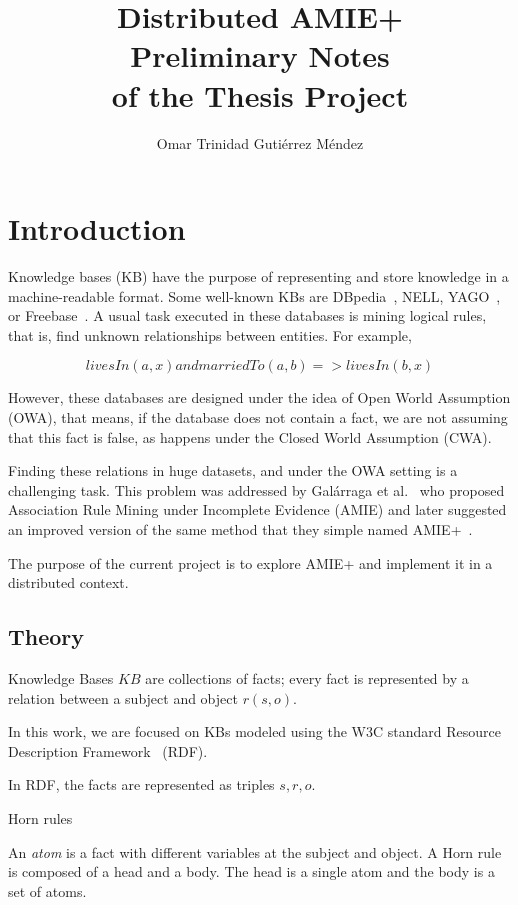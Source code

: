 \documentclass{article}
\title{
Distributed AMIE+\\
\large Preliminary Notes\\
of the Thesis Project\\
}
\author{Omar Trinidad Guti\'errez M\'endez}
\begin{document}
\maketitle

\section{Introduction}

Knowledge bases (KB) have the purpose of representing and store knowledge in a
machine-readable format. Some well-known KBs are DBpedia~\cite{dbpedia-swj},
NELL, YAGO~\cite{suchanek2007yago}, or Freebase~\cite{bollacker2008freebase}. A
usual task executed in these databases is mining logical rules, that is, find
unknown relationships between entities. For example,

\begin{equation*}
livesIn(a, x) and marriedTo(a, b) => livesIn(b, x)
\end{equation*}

However,  these databases are designed under the idea of Open World Assumption
(OWA), that means, if the database does not contain a fact, we are not assuming
that this fact is false, as happens under the Closed World Assumption (CWA).

Finding these relations in huge datasets, and under the OWA setting is a
challenging task. This problem was addressed by Galárraga et
al.~\cite{galarraga2013amie}  who proposed Association Rule Mining under
Incomplete Evidence (AMIE) and later suggested an improved version of the same
method that they simple named AMIE+~\cite{galarraga2015fast}.

The purpose of the current project is to explore AMIE+ and implement it in a
distributed context.

\subsection{Theory}

Knowledge Bases $KB$ are collections of facts; every fact is represented by a
relation between a subject and object $r(s, o)$.

In this work, we are focused on KBs modeled using the W3C standard Resource
Description Framework~\cite{rdf} (RDF).

In RDF, the facts are represented as triples $s, r, o$.

Horn rules

An \textit{atom} is a fact with different variables at the subject and object.
A Horn rule is composed of a head and a body. The head is a single atom and the
body is a set of atoms.
\end{document}
